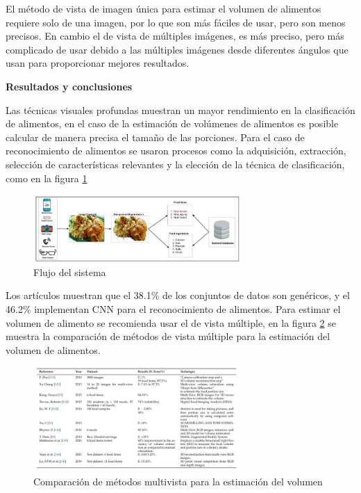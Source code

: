 \thinspace

El método de vista de imagen única para estimar el volumen de alimentos requiere solo de una imagen, por lo que son más fáciles de usar, pero son menos precisos. En cambio el de vista de múltiples imágenes, es más preciso, pero más complicado de usar debido a las múltiples imágenes desde diferentes ángulos que usan para proporcionar mejores resultados. 
\thinspace

\textbf{Resultados y conclusiones}

\thinspace
Las técnicas visuales profundas muestran un mayor rendimiento en la clasificación de alimentos, en el caso de la estimación de volúmenes de alimentos es posible calcular de manera precisa el tamaño de las porciones. Para el caso de reconocimiento de alimentos se usaron procesos como la adquisición, extracción, selección de características relevantes y la elección de la técnica de clasificación, como en la figura \ref{fig7}

\begin{figure}[h]
		\begin{center}
			\includegraphics[width=0.7\textwidth]{2/imagen2/5FIGURA5PAPER1.JPG}
			\caption{Flujo del sistema}
			\label{fig7}
		\end{center}
		
	\end{figure}

\thinspace

 Los artículos muestran que el 38.1\% de los conjuntos de datos son genéricos, y el 46.2\% implementan CNN para el reconocimiento de alimentos. Para estimar el volumen de alimento se recomienda usar el de vista múltiple, en la figura \ref{fig8} se muestra la comparación de métodos de vista múltiple para la estimación del volumen de alimentos. 
 
\begin{figure}[h]
		\begin{center}
			\includegraphics[width=0.7\textwidth]{2/imagen2/4FIGURA4PAPER1.JPG}
	        \caption{Comparación de métodos multivista para la estimación del volumen}
			\label{fig8}
		\end{center}
		
	\end{figure}

